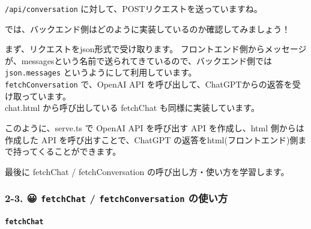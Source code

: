 \texttt{/api/conversation} に対して、POSTリクエストを送っていますね。

では、バックエンド側はどのように実装しているのか確認してみましょう！

\begin{Shaded}
\begin{Highlighting}[]
\OperatorTok{=} \NormalTok{()}\OperatorTok{;}
\OperatorTok{;}
\OperatorTok{=}  \OperatorTok{,} \OperatorTok{,} \NormalTok{)}\OperatorTok{;}
\OperatorTok{;}
  \NormalTok{(}\NormalTok{(\{ }\OperatorTok{:}\OperatorTok{;}
\end{Highlighting}
\end{Shaded}

まず、リクエストをjson形式で受け取ります。
フロントエンド側からメッセージが、messagesという名前で送られてきているので、バックエンド側では\texttt{json.messages}
というようにして利用しています。\\
\texttt{fetchConversation} で、OpenAI API
を呼び出して、ChatGPTからの返答を受け取っています。\\
chat.html から呼び出している fetchChat も同様に実装しています。

このように、serve.ts で OpenAI API を呼び出す API を作成し、html
側からは作成した API を呼び出すことで、ChatGPT
の返答をhtml(フロントエンド)側まで持ってくることができます。

最後に fetchChat / fetchConversation の呼び出し方・使い方を学習します。

\subsubsection{\texorpdfstring{2-3. 😀 \texttt{fetchChat} /
\texttt{fetchConversation}
の使い方}{2-3. 😀 fetchChat / fetchConversation の使い方}}\label{fetchchat-fetchconversation-ux306eux4f7fux3044ux65b9}

\paragraph{\texorpdfstring{\texttt{fetchChat}}{fetchChat}}\label{fetchchat}

